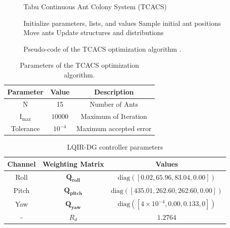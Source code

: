 \documentclass[3p]{elsarticle}
\begin{document}
\begin{figure}[H]
    \begin{algorithm}[H]
        \caption{Tabu Continuous Ant Colony System (TCACS)}
        \begin{algorithmic}[1]
            \State Initialize parameters, lists, and values
                    \State Sample initial ant positions
                \Else
                    \State Move ants
                \EndIf
                \State Update structures and distributions
            \EndWhile
            \EndProcedure
        \end{algorithmic}
        \label{alg:TCACS_code}
    \end{algorithm}
    \vspace{-0.7cm}
    \caption{Pseudo-code of the TCACS optimization algorithm \cite{article_TCACS}.}
    \label{fig:TCACS_code}
\end{figure}

\begin{table}[H]
    \centering
    \caption{Parameters of the TCACS optimization algorithm.}
    \renewcommand{\arraystretch}{1.3}
    \begin{tabular}{@{}ccc@{}}
    \toprule
    Parameter & Value & Description \\
    \midrule
    N & 15 & Number of Ants\\
    $\mathrm{I}_{\max}$ & $10000$ & Maximum of Iteration \\
    Tolerance &	$10^{-\!4}$ &	Maximum accepted error \\
    \bottomrule
\end{tabular}
\label{tab:TCAC_par} %
\end{table}

\begin{table}[H]
    \centering
    \caption{LQIR-DG controller parameters}
    \renewcommand{\arraystretch}{1.3}
    \begin{tabular}{@{}ccc@{}}
    \toprule
    Channel & Weighting Matrix & Values \\
    \midrule
    Roll & $\mathbf{Q_{roll}}$ & $\text{diag}([0.02, 65.96, 83.04, 0.00])$ \\
    Pitch & $\mathbf{Q_{pitch}}$ & $\text{diag}([435.01, 262.60, 262.60, 0.00])$ \\
    Yaw & $\mathbf{Q_{yaw}}$ & $\text{diag}([4 \times 10^{-4}, 0.00, 0.133, 0])$ \\
    -&$R_d$ & $1.2764$ \\
    \bottomrule
    \end{tabular}
    \label{tab:control weight_new} %
\end{table}
\end{document}
